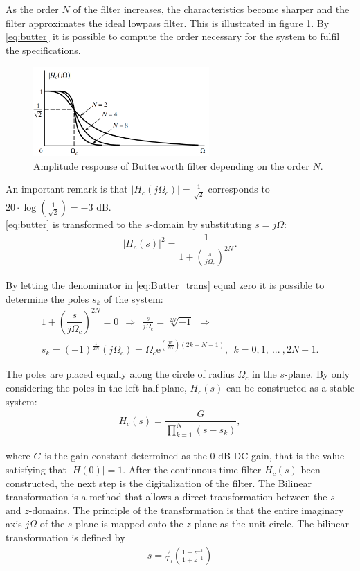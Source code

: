 As the order $N$ of the filter increases, the characteristics become sharper and the filter approximates the ideal lowpass filter. This is illustrated in figure \ref{fig:butter}. By \eqref{eq:butter} it is possible to compute the order necessary for the system to fulfil the specifications.            
\begin{figure}[H]
    \centering
    \includegraphics[width = 0.6\textwidth]{figures/butterworth.png}
    \caption{Amplitude response of Butterworth filter depending on the order $N$.}
    \label{fig:butter}
\end{figure}

An important remark is that $|H_c(j\Omega_c)| = \frac{1}{\sqrt{2}}$ corresponds to $20\cdot \log\left(\frac{1}{\sqrt{2}}\right) = -3$ dB. \\
\eqref{eq:butter} is transformed to the $s$-domain by substituting $s = j\Omega$:
\begin{align} \label{eq:Butter_trans}
|H_c(s)|^2 = \dfrac{1}{1+\left( \frac{s}{j\Omega_c}\right)^{2N}}.
\end{align}

By letting the denominator in \eqref{eq:Butter_trans} equal zero it is possible to determine the poles $s_k$ of the system:
\begin{align*}
1+\left( \dfrac{s}{j\Omega_c}\right)^{2N} = 0 \ \  \Rightarrow  \ \ \frac{s}{j \Omega_c} = \sqrt[2N]{-1} \ \
\Rightarrow \\
s_k = (-1)^{\frac{1}{2N}} \left( j\Omega_c \right) = \Omega_c\text{e}^{ \left( \frac{j\pi}{2N} \right) \left( 2k+ N-1 \right) }, \ \ k=0,1,\ ... \ , 2N-1.
\end{align*}

The poles are placed equally along the circle of radius $\Omega_c$ in the $s$-plane. By only considering the poles in the left half plane, $H_c(s)$ can be constructed as a stable system:
\begin{align*}
H_c(s)=\dfrac{G}{\prod_{k=1}^{N}(s-s_k)},
\end{align*}

where $G$ is the gain constant determined as the 0 dB DC-gain, that is the value satisfying that $|H(0)| = 1$. After the continuous-time filter $H_c(s)$ been constructed, the next step is the digitalization of the filter. The Bilinear transformation is a method that allows a direct transformation between the $s$- and $z$-domains. The principle of the transformation is that the entire imaginary axis $j\Omega$ of the $s$-plane is mapped onto the $z$-plane as the unit circle. The bilinear transformation is defined by 
\begin{align*}
s=\frac{2}{T_d}\left(\frac{1-z^{-1}}{1+z^{-1}}\right)
\end{align*}

